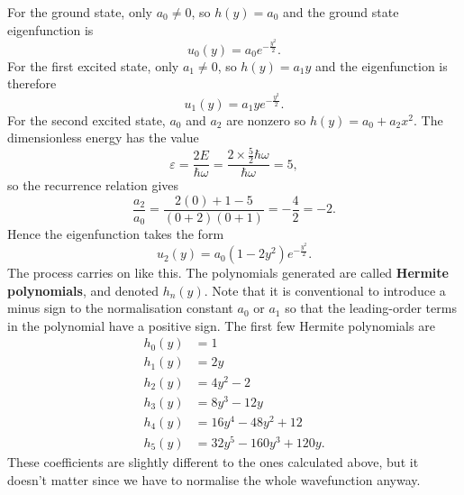 \documentclass[../quantum_mechanics.tex]{subfiles}
\begin{document}
            For the ground state, only $a_0\neq 0$, so $h(y)=a_0$ and the ground state eigenfunction is
            \begin{equation}
                u_0(y)=a_0e^{-\frac{y^2}{2}}.
            \end{equation}
            For the first excited state, only $a_1\neq 0$, so $h(y)=a_1y$ and the eigenfunction is therefore
            \begin{equation}
                u_1(y)=a_1ye^{-\frac{y^2}{2}}.
            \end{equation}
            For the second excited state, $a_0$ and $a_2$ are nonzero so $h(y)=a_0+a_2x^2$.
            The dimensionless energy has the value
            \begin{equation}
                \varepsilon=\frac{2E}{\hbar\omega}=\frac{2\times\frac{5}{2}\hbar\omega}{\hbar\omega}=5,
            \end{equation}
            so the recurrence relation gives
            \begin{equation}
                \frac{a_2}{a_0}=\frac{2(0)+1-5}{(0+2)(0+1)}=-\frac{4}{2}=-2.
            \end{equation}
            Hence the eigenfunction takes the form
            \begin{equation}
                u_2(y)=a_0(1-2y^2)e^{-\frac{y^2}{2}}.
            \end{equation}
            The process carries on like this.
            The polynomials generated are called \textbf{Hermite polynomials}, and denoted $h_n(y)$.
            Note that it is conventional to introduce a minus sign to the normalisation constant $a_0$ or $a_1$ so that the leading-order terms in the polynomial have a positive sign.
            The first few Hermite polynomials are
            \begin{align}
                h_0(y)&=1\\
                h_1(y)&=2y\\
                h_2(y)&=4y^2-2\\
                h_3(y)&=8y^3-12y\\
                h_4(y)&=16y^4-48y^2+12\\
                h_5(y)&=32y^5-160y^3+120y.
            \end{align}
            These coefficients are slightly different to the ones calculated above, but it doesn't matter since we have to normalise the whole wavefunction anyway.
\end{document}
